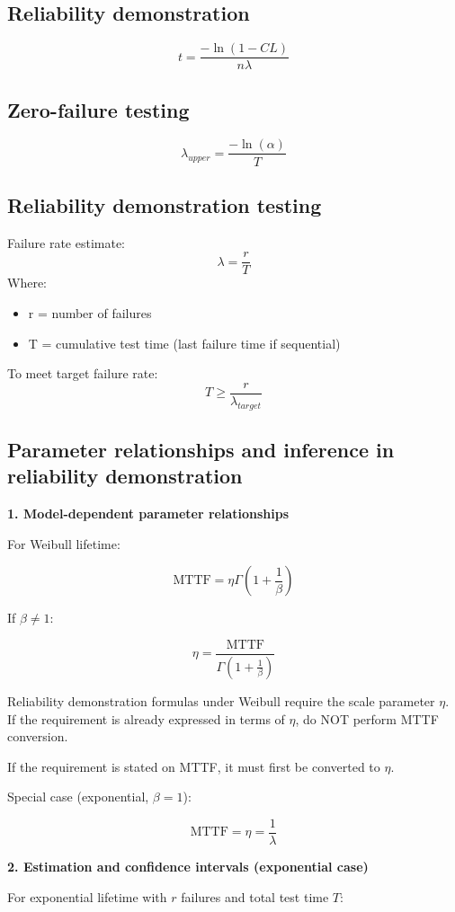 \documentclass[10pt,a4paper,twocolumn]{article}
\begin{document}
\subsection*{Reliability demonstration}
\[t=\frac{-\ln(1-CL)}{n\lambda}\]
\subsection*{Zero-failure testing}

\[\lambda_{upper}=\frac{-\ln(\alpha)}{T}\]
\subsection*{Reliability demonstration testing} 
Failure rate estimate: \[ \lambda = \frac{r}{T} \] Where: \begin{itemize} \item r = number of failures \item T = cumulative test time (last failure time if sequential) \end{itemize} To meet target failure rate: \[ T \geq \frac{r}{\lambda_{target}} \]


\subsection*{Parameter relationships and inference in reliability demonstration}

\textbf{1. Model-dependent parameter relationships}

For Weibull lifetime:

\[\text{MTTF}=\eta\Gamma\left(1+\frac{1}{\beta}\right)\]

If $\beta \neq 1$:

\[\eta=\frac{\text{MTTF}}{\Gamma\left(1+\frac{1}{\beta}\right)}\]

Reliability demonstration formulas under Weibull require the scale parameter $\eta$.
If the requirement is already expressed in terms of $\eta$, 
do NOT perform MTTF conversion.

If the requirement is stated on MTTF, it must first be converted to $\eta$.

Special case (exponential, $\beta=1$):

\[\text{MTTF}=\eta=\frac{1}{\lambda}\]

\bigskip

\textbf{2. Estimation and confidence intervals (exponential case)}

For exponential lifetime with $r$ failures and total test time $T$:
\end{document}
